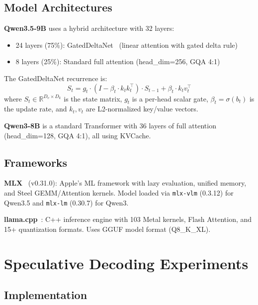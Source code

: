 \documentclass[11pt,a4paper]{article}
\begin{document}
\subsection{Model Architectures}

\textbf{Qwen3.5-9B} uses a hybrid architecture with 32 layers:
\begin{itemize}[leftmargin=2em]
  \item 24 layers (75\%): GatedDeltaNet~\cite{gateddeltanet} (linear attention with gated delta rule)
  \item 8 layers (25\%): Standard full attention (head\_dim=256, GQA 4:1)
\end{itemize}

The GatedDeltaNet recurrence is:
\begin{equation}
  S_t = g_t \cdot (I - \beta_t \cdot k_t k_t^\top) \cdot S_{t-1} + \beta_t \cdot k_t v_t^\top
  \label{eq:gdn}
\end{equation}
where $S_t \in \mathbb{R}^{D_v \times D_k}$ is the state matrix, $g_t$ is a per-head scalar gate, $\beta_t = \sigma(b_t)$ is the update rate, and $k_t, v_t$ are L2-normalized key/value vectors.

\textbf{Qwen3-8B} is a standard Transformer with 36 layers of full attention (head\_dim=128, GQA 4:1), all using KVCache.

\subsection{Frameworks}

\textbf{MLX}~\cite{mlx} (v0.31.0): Apple's ML framework with lazy evaluation, unified memory, and Steel GEMM/Attention kernels. Model loaded via \texttt{mlx-vlm} (0.3.12) for Qwen3.5 and \texttt{mlx-lm} (0.30.7) for Qwen3.

\textbf{llama.cpp}~\cite{llamacpp}: C++ inference engine with 103 Metal kernels, Flash Attention, and 15+ quantization formats. Uses GGUF model format (Q8\_K\_XL).

\section{Speculative Decoding Experiments}

\subsection{Implementation}
\end{document}
